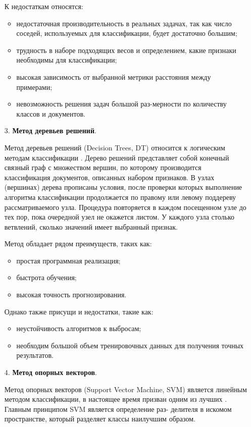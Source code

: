 \begin{enumerate}
К недостаткам относятся: 
\begin{itemize}
\item недостаточная производительность в реальных задачах, так как число соседей, используемых для классификации, будет достаточно большим; 
\item трудность в наборе подходящих весов и определением, какие признаки необходимы для классификации; 
\item высокая зависимость от выбранной метрики расстояния между примерами;
\item невозможность решения задач большой раз-мерности по количеству классов и документов.
\end{itemize}

\item[3.] \textbf{Метод деревьев решений}.

Метод деревьев решений (Decision Trees, DT) относится к логическим методам классификации \cite{tree}. Дерево решений представляет собой конечный связный граф с множеством вершин, по которому производится классификация документов, описанных набором признаков. В узлах (вершинах) дерева прописаны условия, после проверки которых выполнение алгоритма классификации продолжается по правому или левому поддереву рассматриваемого узла. Процедура повторяется в каждом посещенном узле до тех пор, пока очередной узел не окажется листом. У каждого узла столько ветвлений, сколько значений имеет выбранный признак. 

Метод обладает рядом преимуществ, таких как:
\begin{itemize}
\item простая программная реализация;
\item быстрота обучения;
\item высокая точность прогнозирования. 
\end{itemize}

Однако также присущи и недостатки, такие как:
\begin{itemize}
\item неустойчивость алгоритмов к выбросам;
\item необходим большой объем тренировочных данных для получения точных результатов.
\end{itemize}

\item[4.] \textbf{Метод опорных векторов}.

Метод опорных векторов (Support Vector Machine, SVM) является линейным методом классификации, в настоящее время призван одним из лучших \cite{vectors}. Главным принципом SVM является определение раз- делителя в искомом пространстве, который разделяет классы наилучшим образом.


\end{enumerate}
